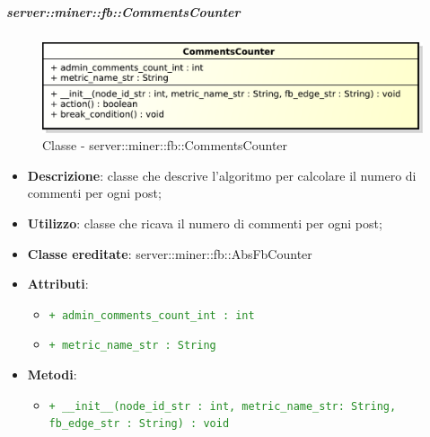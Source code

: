 	\subparagraph{server::miner::fb::CommentsCounter} %
		\label{subp:server_miner_fb_CommentsCounter}
		    \begin{figure}[!htbp]
 		 		\centering
 				\centerline{\includegraphics[scale=0.75]{./images/server/classes/miner/comments_counter.pdf}}
 				\caption{Classe - server::miner::fb::CommentsCounter}
			\end{figure}
			\begin{itemize}
				\item \textbf{Descrizione}: classe che descrive l'algoritmo per calcolare il numero di commenti per ogni post;
				\item \textbf{Utilizzo}: classe che ricava il numero di commenti per ogni post;
				\item \textbf{Classe ereditate}: server::miner::fb::AbsFbCounter
				\item \textbf{Attributi}: 
					\begin{itemize}
						\item \textcolor{forestgreen}{\texttt{+ admin\_comments\_count\_int : int}}
						\item \textcolor{forestgreen}{\texttt{+ metric\_name\_str : String}}
					\end{itemize}
				\item \textbf{Metodi}:  
					\begin{itemize}
						\item \textcolor{forestgreen}{\texttt{+ \_\_init\_\_(node\_id\_str : int, metric\_name\_str: String, fb\_edge\_str : String) : void}}
						\begin{description}

\end{description}
\end{itemize}
\end{itemize}
